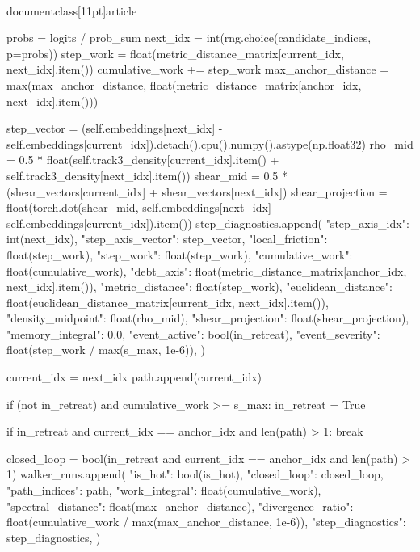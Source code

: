 \\documentclass[11pt]{article}
\begin{document}
\begin{CodeBlock}
                probs = logits / prob_sum
                next_idx = int(rng.choice(candidate_indices, p=probs))
                step_work = float(metric_distance_matrix[current_idx, next_idx].item())
                cumulative_work += step_work
                max_anchor_distance = max(max_anchor_distance, float(metric_distance_matrix[anchor_idx, next_idx].item()))

                step_vector = (self.embeddings[next_idx] - self.embeddings[current_idx]).detach().cpu().numpy().astype(np.float32)
                rho_mid = 0.5 * float(self.track3_density[current_idx].item() + self.track3_density[next_idx].item())
                shear_mid = 0.5 * (shear_vectors[current_idx] + shear_vectors[next_idx])
                shear_projection = float(torch.dot(shear_mid, self.embeddings[next_idx] - self.embeddings[current_idx]).item())
                step_diagnostics.append(
                    {
                        "step_axis_idx": int(next_idx),
                        "step_axis_vector": step_vector,
                        "local_friction": float(step_work),
                        "step_work": float(step_work),
                        "cumulative_work": float(cumulative_work),
                        "debt_axis": float(metric_distance_matrix[anchor_idx, next_idx].item()),
                        "metric_distance": float(step_work),
                        "euclidean_distance": float(euclidean_distance_matrix[current_idx, next_idx].item()),
                        "density_midpoint": float(rho_mid),
                        "shear_projection": float(shear_projection),
                        "memory_integral": 0.0,
                        "event_active": bool(in_retreat),
                        "event_severity": float(step_work / max(s_max, 1e-6)),
                    }
                )

                current_idx = next_idx
                path.append(current_idx)

                if (not in_retreat) and cumulative_work >= s_max:
                    in_retreat = True

                if in_retreat and current_idx == anchor_idx and len(path) > 1:
                    break

            closed_loop = bool(in_retreat and current_idx == anchor_idx and len(path) > 1)
            walker_runs.append(
                {
                    "is_hot": bool(is_hot),
                    "closed_loop": closed_loop,
                    "path_indices": path,
                    "work_integral": float(cumulative_work),
                    "spectral_distance": float(max_anchor_distance),
                    "divergence_ratio": float(cumulative_work / max(max_anchor_distance, 1e-6)),
                    "step_diagnostics": step_diagnostics,
                }
            )


\end{CodeBlock}
\end{document}
